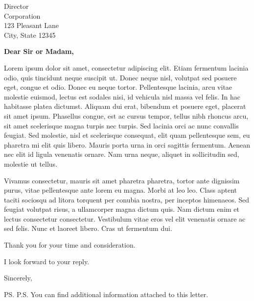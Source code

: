 \documentclass{letter}
\begin{document}

\begin{letter}{Director \\ Corporation \\ 123 Pleasant Lane \\ City, State 12345} %


\opening{\textbf{Dear Sir or Madam,}}
 
Lorem ipsum dolor sit amet, consectetur adipiscing elit. Etiam fermentum lacinia odio, quis tincidunt neque suscipit ut. Donec neque nisl, volutpat sed posuere eget, congue et odio. Donec eu neque tortor. Pellentesque lacinia, arcu vitae molestie euismod, lectus est sodales nisi, id vehicula nisl massa vel felis. In hac habitasse platea dictumst. Aliquam dui erat, bibendum et posuere eget, placerat sit amet ipsum. Phasellus congue, est ac cursus tempor, tellus nibh rhoncus arcu, sit amet scelerisque magna turpis nec turpis. Sed lacinia orci ac nunc convallis feugiat. Sed molestie, nisl et scelerisque consequat, elit quam pellentesque sem, eu pharetra mi elit quis libero. Mauris porta urna in orci sagittis fermentum. Aenean nec elit id ligula venenatis ornare. Nam urna neque, aliquet in sollicitudin sed, molestie ut tellus.

Vivamus consectetur, mauris sit amet pharetra pharetra, tortor ante dignissim purus, vitae pellentesque ante lorem eu magna. Morbi at leo leo. Class aptent taciti sociosqu ad litora torquent per conubia nostra, per inceptos himenaeos. Sed feugiat volutpat risus, a ullamcorper magna dictum quis. Nam dictum enim et lectus consectetur consectetur. Vestibulum vitae eros vel elit venenatis ornare ac sed felis. Nunc et laoreet libero. Cras ut fermentum dui.

Thank you for your time and consideration.

I look forward to your reply.

\vspace{2\parskip} %
\closing{Sincerely,}
\vspace{2\parskip} %

\ps{P.S. You can find additional information attached to this letter.} %



\end{letter}
 
\end{document}
